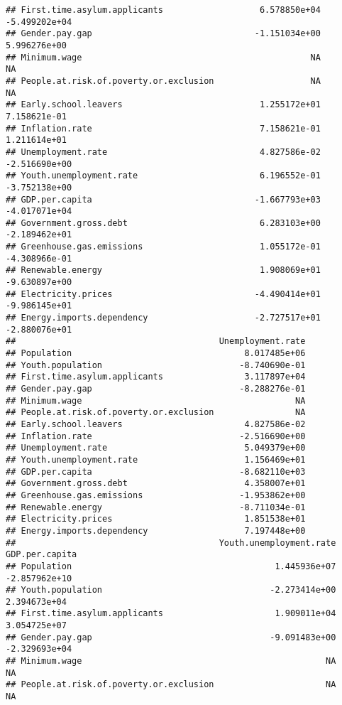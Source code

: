 \documentclass[
]{article}
\begin{document}
\begin{verbatim}
## First.time.asylum.applicants                   6.578850e+04  -5.499202e+04
## Gender.pay.gap                                -1.151034e+00   5.996276e+00
## Minimum.wage                                             NA             NA
## People.at.risk.of.poverty.or.exclusion                   NA             NA
## Early.school.leavers                           1.255172e+01   7.158621e-01
## Inflation.rate                                 7.158621e-01   1.211614e+01
## Unemployment.rate                              4.827586e-02  -2.516690e+00
## Youth.unemployment.rate                        6.196552e-01  -3.752138e+00
## GDP.per.capita                                -1.667793e+03  -4.017071e+04
## Government.gross.debt                          6.283103e+00  -2.189462e+01
## Greenhouse.gas.emissions                       1.055172e-01  -4.308966e-01
## Renewable.energy                               1.908069e+01  -9.630897e+00
## Electricity.prices                            -4.490414e+01  -9.986145e+01
## Energy.imports.dependency                     -2.727517e+01  -2.880076e+01
##                                        Unemployment.rate
## Population                                  8.017485e+06
## Youth.population                           -8.740690e-01
## First.time.asylum.applicants                3.117897e+04
## Gender.pay.gap                             -8.288276e-01
## Minimum.wage                                          NA
## People.at.risk.of.poverty.or.exclusion                NA
## Early.school.leavers                        4.827586e-02
## Inflation.rate                             -2.516690e+00
## Unemployment.rate                           5.049379e+00
## Youth.unemployment.rate                     1.156469e+01
## GDP.per.capita                             -8.682110e+03
## Government.gross.debt                       4.358007e+01
## Greenhouse.gas.emissions                   -1.953862e+00
## Renewable.energy                           -8.711034e-01
## Electricity.prices                          1.851538e+01
## Energy.imports.dependency                   7.197448e+00
##                                        Youth.unemployment.rate GDP.per.capita
## Population                                        1.445936e+07  -2.857962e+10
## Youth.population                                 -2.273414e+00   2.394673e+04
## First.time.asylum.applicants                      1.909011e+04   3.054725e+07
## Gender.pay.gap                                   -9.091483e+00  -2.329693e+04
## Minimum.wage                                                NA             NA
## People.at.risk.of.poverty.or.exclusion                      NA             NA

\end{verbatim}
\end{document}
